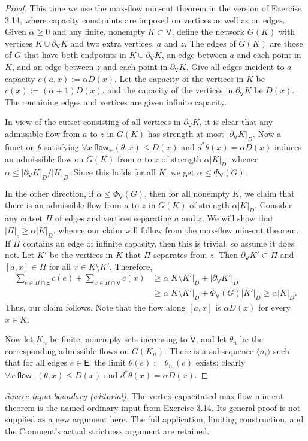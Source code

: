 \documentclass[11pt]{article}
\newcommand{\V}{\mathsf V}
\newcommand{\E}{\mathsf E}
\newcommand{\PV}{\Phi_{\V}}
\newcommand{\flow}{\mathsf{flow}_{+}}
\begin{document}
\begin{proof}
This time we use the max-flow min-cut theorem in the version of Exercise 3.14, where capacity constraints are imposed on vertices as well as on edges. Given $\alpha\geq0$ and any finite, nonempty $K\subset\V$, define the network $G(K)$ with vertices $K\cup\partial_{\V}K$ and two extra vertices, $a$ and $z$. The edges of $G(K)$ are those of $G$ that have both endpoints in $K\cup\partial_{\V}K$, an edge between $a$ and each point in $K$, and an edge between $z$ and each point in $\partial_{\V}K$. Give all edges incident to $a$ capacity $c(a,x):=\alpha D(x)$. Let the capacity of the vertices in $K$ be $c(x):=(\alpha+1)D(x)$, and the capacity of the vertices in $\partial_{\V}K$ be $D(x)$. The remaining edges and vertices are given infinite capacity.

In view of the cutset consisting of all vertices in $\partial_{\V}K$, it is clear that any admissible flow from $a$ to $z$ in $G(K)$ has strength at most $|\partial_{\V}K|_D$. Now a function $\theta$ satisfying $\forall x\ \flow(\theta,x)\leq D(x)$ and $d^*\theta(x)=\alpha D(x)$ induces an admissible flow on $G(K)$ from $a$ to $z$ of strength $\alpha|K|_D$, whence $\alpha\leq|\partial_{\V}K|_D/|K|_D$. Since this holds for all $K$, we get $\alpha\leq\PV(G)$.

In the other direction, if $\alpha\leq\PV(G)$, then for all nonempty $K$, we claim that there is an admissible flow from $a$ to $z$ in $G(K)$ of strength $\alpha|K|_D$. Consider any cutset $\Pi$ of edges and vertices separating $a$ and $z$. We will show that $|\Pi|_c\geq\alpha|K|_D$, whence our claim will follow from the max-flow min-cut theorem. If $\Pi$ contains an edge of infinite capacity, then this is trivial, so assume it does not. Let $K'$ be the vertices in $K$ that $\Pi$ separates from $z$. Then $\partial_{\V}K'\subset\Pi$ and $[a,x]\in\Pi$ for all $x\in K\setminus K'$. Therefore,
\[
\begin{aligned}
\sum_{e\in\Pi\cap\E}c(e)+\sum_{x\in\Pi\cap\V}c(x)
&\geq\alpha|K\setminus K'|_D+|\partial_{\V}K'|_D\\
&\geq\alpha|K\setminus K'|_D+\PV(G)|K'|_D\geq\alpha|K|_D.
\end{aligned}
\]
Thus, our claim follows. Note that the flow along $[a,x]$ is $\alpha D(x)$ for every $x\in K$.

Now let $K_n$ be finite, nonempty sets increasing to $\V$, and let $\theta_n$ be the corresponding admissible flows on $G(K_n)$. There is a subsequence $\langle n_i\rangle$ such that for all edges $e\in\E$, the limit $\theta(e):=\theta_{n_i}(e)$ exists; clearly $\forall x\ \flow(\theta,x)\leq D(x)$ and $d^*\theta(x)=\alpha D(x)$.
\end{proof}
\noindent\textit{Source input boundary (editorial).} The vertex-capacitated max-flow min-cut theorem is the named ordinary input from Exercise 3.14. Its general proof is not supplied as a new argument here. The full application, limiting construction, and the Comment's actual strictness argument are retained.
\end{document}
